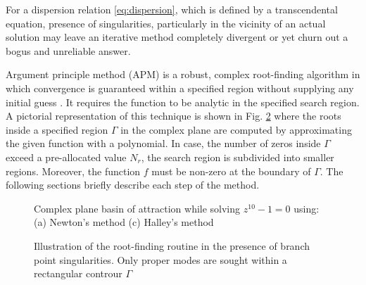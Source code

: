 For a dispersion relation \eqref{eq:dispersion}, which is defined by a transcendental equation, presence of singularities, particularly in the vicinity of an actual solution may leave an iterative method completely divergent or yet churn out a bogus and unreliable answer.

Argument principle method (APM) is a robust, complex root-finding algorithm in which convergence is guaranteed within a specified region without supplying any initial guess \cite{Delves1967c,Carpentier1982c,Botten1983,Kravanja2000c,Dellnitz2002c,Gillan2006c,Chen2017}. It requires the function to be analytic in the specified search region. A pictorial representation of this technique is shown in Fig. \ref{fig:zplane} where the roots inside a specified region $\Gamma$ in the complex plane are computed by approximating the given function with a polynomial. In case, the number of zeros inside $\Gamma$ exceed a pre-allocated value $N_r$, the search region is subdivided into smaller regions. Moreover, the function $f$ must be non-zero at the boundary of $\Gamma$. The following sections briefly describe each step of the method.
%
\begin{figure}[t!]
  \centering
   \hfil
  \caption{Complex plane basin of attraction while solving $z^{10} - 1 =0$ using: (a) Newton's method (c) Halley's method}
  \label{fig:basins}
\end{figure}
%
\begin{figure}[t!]
  \centering
  \def\svgwidth{.5\linewidth}
  
  \caption{Illustration of the root-finding routine in the presence of branch point singularities. Only proper modes are sought within a rectangular controur $\Gamma$}
  \label{fig:zplane}
\end{figure}
